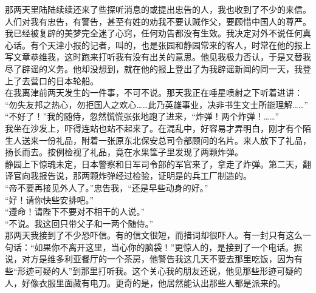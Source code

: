 那两天里陆陆续续还来了些探听消息的或提出忠告的人，我也收到了不少的来信。人们对我有忠告，有警告，甚至有姓的劝我不要认贼作父，要顾惜中国人的尊严。我已经被复辟的美梦完全迷了心窍，任何劝告都没有生效。我决定对外不说任何真心话。有个天津小报的记者，叫的，也是张园和静园常来的客人，时常在他的报上写文章恭维我，这时跑来打听我有没有出关的意思。他见我极力否认，于是又替我尽了辟谣的义务。他却没想到，就在他的报上登出了为我辟谣新闻的同一天，我登上了去营口的日本轮船。\\

在我离津前两天发生的一件事，不可不说。那天我正在唾星喷射之下听着进讲：\\

“勿失友邦之热心，勿拒国人之欢心……此乃英雄事业，决非书生文士所能理解……”\\

“不好了！”我的随侍，忽然慌慌张张地跑了进来，“炸弹！两个炸弹！……”\\

我坐在沙发上，吓得连站也站不起来了。在混乱中，好容易才弄明白，刚才有个陌生人送来一份礼品，附着一张原东北保安总司令部顾问的名片。来人放下了礼品，扬长而去。按例检视了礼品，竟在水果筐子里发现了两颗炸弹。\\

静园上下惊魂未定，日本警察和日军司令部的军官来了，拿走了炸弹。第二天，翻译官向我报告说，那两颗炸弹经过检验，证明是的兵工厂制造的。\\

“帝不要再接见外人了。”忠告我，“还是早些动身的好。”\\

“好！请你快些安排吧。”\\

“遵命！请陛下不要对不相干的人说。”\\

“不说。我这回只带父子和一两个随侍。”\\

那两天我接到了不少恐吓信。有的信文很短，而措词却很吓人。有一封只有这么一句话：“如果你不离开这里，当心你的脑袋！”更惊人的，是接到了一个电话。据说，对方是维多利亚餐厅的一个茶房，他警告我这几天不要去那里吃饭，因为有些“形迹可疑的人”到那里打听我。这个关心我的朋友还说，他见那些形迹可疑的人，好像衣服里面藏有电刀。更奇的是，他居然能认出那些人都是派来的。\\

